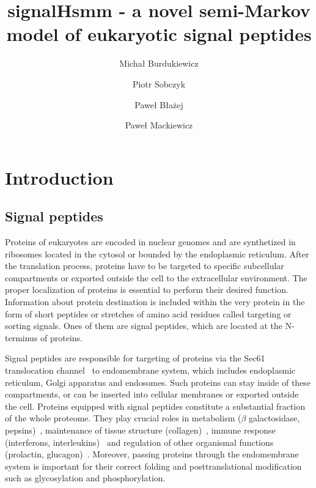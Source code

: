 \documentclass[fleqn,10pt,twoside]{gcb15submission}
\title{signalHsmm - a novel semi-Markov model of eukaryotic signal peptides}
\author[1]{Micha\l{}  Burdukiewicz}
\author[2]{Piotr Sobczyk}
\author[1]{Pawe\l{} B\l{}a\.{z}ej}
\author[1]{Pawe\l{} Mackiewicz}
\affil[1]{University of Wroc\l{}aw, Department of Genomics, Poland}
\affil[2]{Wroc\l{}aw University of Technology, Department of Mathematics, Poland}
\begin{document}
\flushbottom
\maketitle
\thispagestyle{empty}


\section*{Introduction}

\subsection*{Signal peptides}

Proteins of eukaryotes are encoded in nuclear genomes and are synthetized in ribosomes located in the cytosol or bounded by the endoplasmic reticulum. After the translation process, proteins have to be targeted to specific subcellular compartments or exported outside the cell to the extracellular environment. The proper localization of proteins is essential to perform their desired function. Information about protein destination is included within the very protein in the form of short peptides or stretches of amino acid residues called targeting or sorting signals. Ones of them are signal peptides, which are located at the N-terminus of proteins.

Signal peptides are responsible for targeting of proteins via the Sec61 translocation channel~\citep{2007rapoportprotein} to endomembrane system, which includes endoplasmic reticulum, Golgi apparatus and endosomes. Such proteins can stay inside of these compartments, or can be inserted into cellular membranes or exported outside the cell. Proteins equipped with signal peptides constitute a substantial fraction of the whole proteome. They play crucial roles in metabolism ($\beta$ galactosidase, pepsins)~\citep{1991hofmannmutations}, maintenance of tissue structure (collagen)~\citep{2001chanaberrant}, immune response (interferons, interleukins)~\citep{2005zhangalteration} and regulation of other organismal functions (prolactin, glucagon)~\citep{2010huangrole}. Moreover, passing proteins through the endomembrane system is important for their correct folding and posttranslational modification such as glycosylation and phosphorylation.
\end{document}
